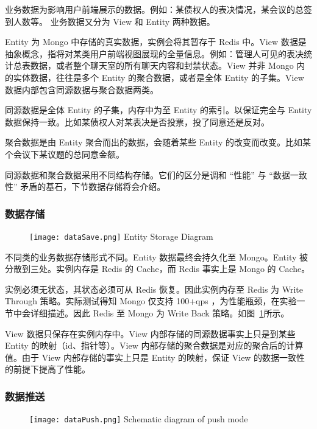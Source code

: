 业务数据为影响用户前端展示的数据。例如：某债权人的表决情况，某会议的总签到人数等。
业务数据又分为 View 和 Entity 两种数据。

Entity 为 Mongo 中存储的真实数据，实例会将其暂存于 Redis 中。View 数据是抽象概念，指将对某类用户前端视图展现的全量信息。例如：管理人可见的表决统计总表数据，或者整个聊天室的所有聊天内容和封禁状态。View 并非 Mongo 内的实体数据，往往是多个 Entity 的聚合数据，或者是全体 Entity 的子集。View 数据内部包含同源数据与聚合数据两类。

同源数据是全体 Entity 的子集，内存中为至 Entity 的索引。以保证完全与 Entity 数据保持一致。比如某债权人对某表决是否投票，投了同意还是反对。

聚合数据是由 Entity 聚合而出的数据，会随着某些 Entity 的改变而改变。比如某个会议下某议题的总同意金额。

同源数据和聚合数据采用不同结构存储。它们的区分是调和 “性能” 与 “数据一致性” 矛盾的基石，下节数据存储将会介绍。

\subsubsection{数据存储}

\begin{figure}[!htp]
  \centering
  \texttt{[image: dataSave.png]}
    {Entity Storage Diagram}
 \label{fig:dataSave}
\end{figure}

不同类的业务数据存储形式不同。Entity 数据最终会持久化至 Mongo。Entity 被分散到三处。实例内存是 Redis 的 Cache，而 Redis 事实上是 Mongo 的 Cache。

实例必须无状态，其状态必须可从 Redis 恢复。因此实例内存至 Redis 为 Write Through 策略。实际测试得知 Mongo 仅支持 100+qps ，为性能瓶颈，在实验一节中会详细描述。因此 Redis 至 Mongo 为 Write Back 策略。如图~\ref{fig:dataSave}所示。

View 数据只保存在实例内存中。View 内部存储的同源数据事实上只是到某些 Entity 的映射（id、指针等）。View 内部存储的聚合数据是对应的聚合后的计算值。由于 View 内部存储的事实上只是 Entity 的映射，保证 View 的数据一致性的前提下提高了性能。

\subsubsection{数据推送}

\begin{figure}[!htp]
  \centering
  \texttt{[image: dataPush.png]}
    {Schematic diagram of push mode}
 \label{fig:dataPush}
\end{figure}

